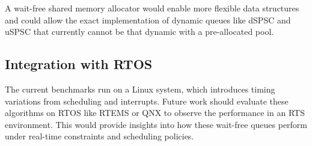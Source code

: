A wait-free shared memory allocator would enable more flexible data structures and could allow the exact implementation of dynamic queues like \ac{dSPSC} and \ac{uSPSC} that currently cannot be that dynamic with a pre-allocated pool.

\subsection{Integration with \acf{RTOS}}
The current benchmarks run on a Linux system, which introduces timing variations from scheduling and interrupts. Future work should evaluate these algorithms on \ac{RTOS} like RTEMS or QNX to observe the performance in an \ac{RTS} environment. This would provide insights into how these wait-free queues perform under real-time constraints and scheduling policies.
